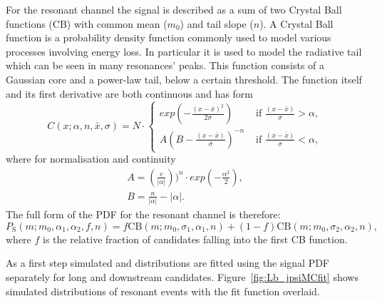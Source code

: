 For the resonant channel the signal is described as a sum of two Crystal Ball functions (CB) with
common mean ($m_0$) and tail slope ($n$). A Crystal Ball function \cite{Skwarnicki:1986xj} is a probability
density function commonly used to model various processes involving energy loss. In particular it is used
to model the radiative tail which can be seen in many resonances' peaks. This function 
consists of a Gaussian core and a power-law tail, below a certain threshold. The function itself 
and its first derivative are both continuous and has form
%
\begin{equation}
C(x;\alpha,n,\bar{x},\sigma) = N \cdot
\begin{cases}
exp \left( -\frac{(x - \bar{x})^2}{2\sigma} \right)  & \mbox{   if   } \frac{(x - \bar{x})}{\sigma} > \alpha, \\
A\left( B - \frac{(x - \bar{x})}{\sigma} \right)^{-n} & \mbox{   if   } \frac{(x - \bar{x})}{\sigma} < \alpha,
\end{cases}
\end{equation}
%
where for normalisation and continuity
%
\begin{equation}
\label{CB}
\begin{array}{ll}
A = \left( \frac{c}{|\alpha|} \right))^n \cdot exp(- \frac{\alpha^2}{2}), \\
B = \frac{n}{|\alpha|} - |\alpha|.
\end{array}
\end{equation}
%
The full form of the PDF for the resonant channel is therefore:
%
\begin{equation}
P_\mathrm{S}(m;m_0,\alpha_1,\alpha_2,f,n) = f \text{CB}(m;m_0,\sigma_1,\alpha_1,n)+(1-f)\text{CB}(m;m_0,\sigma_2,\alpha_2,n),
\end{equation}
%
where $f$ is the relative fraction of candidates falling into the first CB function.

As a first step simulated \Lb\to\Lz\mumu and \Lb\to\jpsi\Lz distributions are fitted using the signal PDF
separately for long and downstream candidates. Figure~\ref{fig:Lb_jpsiMCfit} shows simulated distributions
of resonant events with the fit function overlaid.

